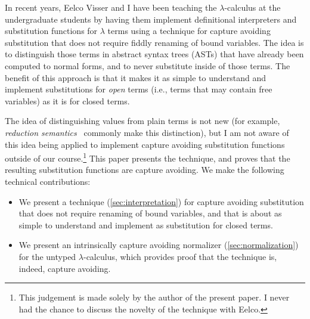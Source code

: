 In recent years, Eelco Visser and I have been teaching the $\lambda$-calculus at the undergraduate students by having them implement definitional interpreters and substitution functions for $\lambda$ terms using a technique for capture avoiding substitution that does not require fiddly renaming of bound variables.
The idea is to distinguish those terms in abstract syntax trees (ASTs) that have already been computed to normal forms, and to never substitute inside of those terms.
The benefit of this approach is that it makes it as simple to understand and implement substitutions for \emph{open} terms (i.e., terms that may contain free variables) as it is for closed terms.

The idea of distinguishing values from plain terms is not new (for example, \emph{reduction semantics}~\citep{FelleisenH92} commonly make this distinction), but I am not aware of this idea being applied to implement capture avoiding substitution functions outside of our course.\footnote{This judgement is made solely by the author of the present paper. I never had the chance to discuss the novelty of the technique with Eelco.}
This paper presents the technique, and proves that the resulting substitution functions are capture avoiding.
We make the following technical contributions:

\begin{itemize}
\item We present a technique (\cref{sec:interpretation}) for capture avoiding substitution that does not require renaming of bound variables, and that is about as simple to understand and implement as substitution for closed terms.
\item We present an intrinsically capture avoiding normalizer (\cref{sec:normalization}) for the untyped $\lambda$-calculus, which provides proof that the technique is, indeed, capture avoiding.
\end{itemize}





